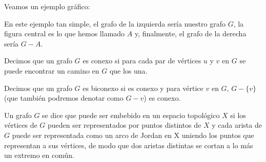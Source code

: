 	Veamos un ejemplo gráfico:
\[\]
\[\]
En este ejemplo tan simple, el grafo de la izquierda sería nuestro grafo $G$, la figura central es lo que hemos llamado $A$ y, finalmente, el grafo de la derecha sería $G-A$.

\begin{definition}
	Decimos que un grafo $G$ es conexo si para cada par de vértices $u$ y $v$ en $G$ se puede encontrar un camino en $G$ que los una.
\end{definition}

\begin{definition}
	Decimos que un grafo $G$ es biconexo si es conexo y para vértice $v$ en $G$, $G - \{v\}$ (que también podremos denotar como $G - v$) es conexo.
\end{definition}

\begin{definition}
Un grafo $G$ se dice que puede ser embebido en un espacio topológico $X$ si los vértices de $G$ pueden ser representados por puntos distintos de $X$ y cada arista de $G$ puede ser representada como un arco de Jordan en X uniendo los puntos que representan a sus vértices, de  modo que dos aristas distintas se cortan a lo más un extremo en común.
\end{definition}

